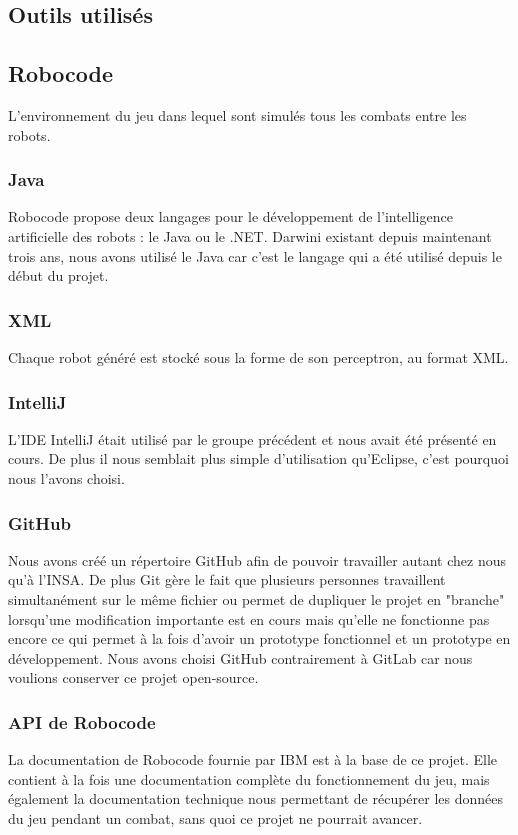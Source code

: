 \documentclass[a4paper,11pt]{article}
\begin{document}
\subsection{Outils utilisés}

\subsection{Robocode}
L'environnement du jeu dans lequel sont simulés tous les combats entre les robots.

\subsubsection{Java}
Robocode propose deux langages pour le développement de l'intelligence artificielle des robots : le Java ou le .NET. Darwini existant depuis maintenant trois ans, nous avons utilisé le Java car c'est le langage qui a été utilisé depuis le début du projet.

\subsubsection{XML}
Chaque robot généré est stocké sous la forme de son perceptron, au format XML. 

\subsubsection{IntelliJ}
L'IDE IntelliJ était utilisé par le groupe précédent et nous avait été présenté en cours. De plus il nous semblait plus simple d'utilisation qu'Eclipse, c'est pourquoi nous l'avons choisi.

\subsubsection{GitHub}
Nous avons créé un répertoire GitHub afin de pouvoir travailler autant chez nous qu'à l'INSA. De plus Git gère le fait que plusieurs personnes travaillent simultanément sur le même fichier ou permet de dupliquer le projet en "branche" lorsqu'une modification importante est en cours mais qu'elle ne fonctionne pas encore ce qui permet à la fois d'avoir un prototype fonctionnel et un prototype en développement. Nous avons choisi GitHub contrairement à GitLab car nous voulions conserver ce projet open-source.

\subsubsection{API de Robocode}
La documentation de Robocode fournie par IBM est à la base de ce projet. Elle contient à la fois une documentation complète du fonctionnement du jeu, mais également la documentation technique nous permettant de récupérer les données du jeu pendant un combat, sans quoi ce projet ne pourrait avancer.
\end{document}
